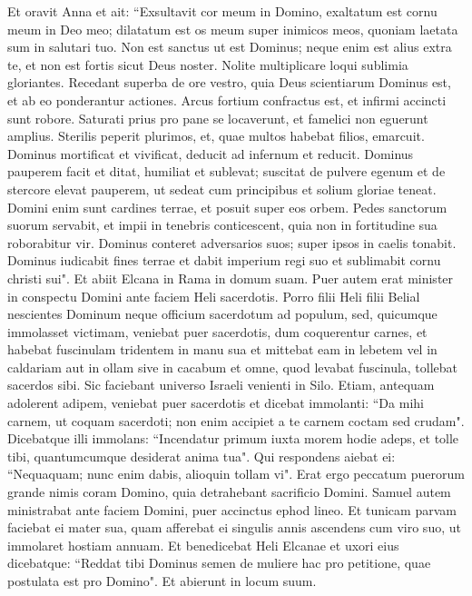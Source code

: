 \begin{biblechapter}  
\verse Et oravit Anna et ait: “Exsultavit cor meum in Domino, exaltatum est cornu meum in Deo meo; dilatatum est os meum super inimicos meos, quoniam laetata sum in salutari tuo. 
\verse Non est sanctus ut est Dominus; neque enim est alius extra te, et non est fortis sicut Deus noster. 
\verse Nolite multiplicare loqui sublimia gloriantes. Recedant superba de ore vestro, quia Deus scientiarum Dominus est, et ab eo ponderantur actiones. 
\verse Arcus fortium confractus est, et infirmi accincti sunt robore. 
\verse Saturati prius pro pane se locaverunt, et famelici non eguerunt amplius. Sterilis peperit plurimos, et, quae multos habebat filios, emarcuit. 
\verse Dominus mortificat et vivificat, deducit ad infernum et reducit. 
\verse Dominus pauperem facit et ditat, humiliat et sublevat; 
\verse suscitat de pulvere egenum et de stercore elevat pauperem, ut sedeat cum principibus et solium gloriae teneat. Domini enim sunt cardines terrae, et posuit super eos orbem. 
\verse Pedes sanctorum suorum servabit, et impii in tenebris conticescent, quia non in fortitudine sua roborabitur vir. 
\verse Dominus conteret adversarios suos; super ipsos in caelis tonabit. Dominus iudicabit fines terrae et dabit imperium regi suo et sublimabit cornu christi sui". 
\verse Et abiit Elcana in Rama in domum suam. Puer autem erat minister in conspectu Domini ante faciem Heli sacerdotis. 
\verse Porro filii Heli filii Belial nescientes Dominum 
\verse neque officium sacerdotum ad populum, sed, quicumque immolasset victimam, veniebat puer sacerdotis, dum coquerentur carnes, et habebat fuscinulam tridentem in manu sua  
\verse et mittebat eam in lebetem vel in caldariam aut in ollam sive in cacabum et omne, quod levabat fuscinula, tollebat sacerdos sibi. Sic faciebant universo Israeli venienti in Silo. 
\verse Etiam, antequam adolerent adipem, veniebat puer sacerdotis et dicebat immolanti: “Da mihi carnem, ut coquam sacerdoti; non enim accipiet a te carnem coctam sed crudam". 
\verse Dicebatque illi immolans: “Incendatur primum iuxta morem hodie adeps, et tolle tibi, quantumcumque desiderat anima tua". Qui respondens aiebat ei: “Nequaquam; nunc enim dabis, alioquin tollam vi". 
\verse Erat ergo peccatum puerorum grande nimis coram Domino, quia detrahebant sacrificio Domini. 
\verse Samuel autem ministrabat ante faciem Domini, puer accinctus ephod lineo.  
\verse Et tunicam parvam faciebat ei mater sua, quam afferebat ei singulis annis ascendens cum viro suo, ut immolaret hostiam annuam. 
\verse Et benedicebat Heli Elcanae et uxori eius dicebatque: “Reddat tibi Dominus semen de muliere hac pro petitione, quae postulata est pro Domino". Et abierunt in locum suum. 

\end{biblechapter}
